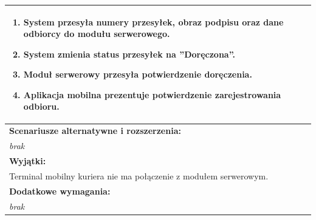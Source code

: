 \begin{center}
\begin{longtable}[h]{|p{1.6cm}|p{13.5cm}|}
{\begin{enumerate}
\item System przesyła numery przesyłek, obraz podpisu oraz dane odbiorcy do modułu serwerowego.
\item System zmienia status przesyłek na ''Doręczona''.
\item Moduł serwerowy przesyła potwierdzenie doręczenia.
\item Aplikacja mobilna prezentuje potwierdzenie zarejestrowania odbioru.
\end{enumerate}
} \\ \hline
\multicolumn{2}{|p{15.1cm}|}{\textbf{Scenariusze alternatywne i rozszerzenia:}} \\
\multicolumn{2}{|p{15.1cm}|}{
\textit{brak}
} \\ \hline
\multicolumn{2}{|p{15.1cm}|}{\textbf{Wyjątki:}} \\
\multicolumn{2}{|p{15.1cm}|}{
Terminal mobilny kuriera nie ma połączenie z modułem serwerowym.
} \\ \hline
\multicolumn{2}{|p{15.1cm}|}{\textbf{Dodatkowe wymagania:}} \\
\multicolumn{2}{|p{15.1cm}|}{
\textit{brak}
} \\
\hline
\end{longtable}
\end{center}

